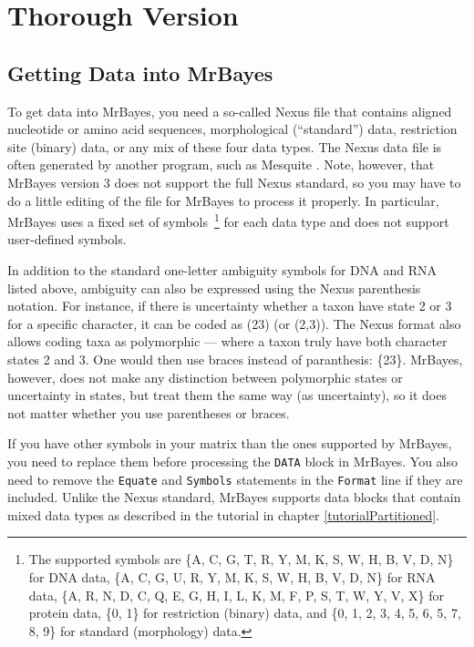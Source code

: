 \documentclass[12pt]{book}
\newcommand{\ttt}[1]{\texttt{#1}}
\begin{document}
\section{Thorough Version}

\subsection{Getting Data into MrBayes}

To get data into MrBayes, you need a so-called Nexus file that contains aligned nucleotide or amino
acid sequences, morphological (``standard'') data, restriction site (binary) data, or any mix of
these four data types. The Nexus data file is often generated by another program, such as Mesquite
\citep{maddison06}. Note, however, that MrBayes version 3 does not support the full Nexus standard,
so you may have to do a little editing of the file for MrBayes to process it properly. In
particular, MrBayes uses a fixed set of symbols~\footnote{The supported symbols are \{A, C, G, T, R, 
Y, M, K, S, W, H, B, V, D, N\} for DNA data, \{A, C, G, U, R, Y, M, K, S, W, H, B, V, D, N\} for RNA 
data, \{A, R, N, D, C, Q, E, G, H, I, L, K, M, F, P, S, T, W, Y, V, X\} for protein data, \{0, 1\} 
for restriction (binary) data, and \{0, 1, 2, 3, 4, 5, 6, 5, 7, 8, 9\} for standard (morphology) 
data.} for each data type and does not support user-defined symbols. 

In addition to the standard one-letter ambiguity symbols for DNA and RNA listed above, ambiguity
can also be expressed using the Nexus parenthesis notation. For instance, if there is uncertainty
whether a taxon have state 2 or 3 for a specific character, it can be coded as (23) (or (2,3)).
The Nexus format also allows coding taxa as polymorphic --- where a taxon truly have both character
states 2 and 3. One would then use braces instead of paranthesis: \{23\}. MrBayes, however, does
not make any distinction between polymorphic states or uncertainty in states, but treat them the
same way (as uncertainty), so it does not matter whether you use parentheses or braces.

If you have other symbols in your matrix than the ones supported by MrBayes, you need to replace
them before processing the \ttt{DATA} block in MrBayes. You also need to remove the \ttt{Equate}
and \ttt{Symbols} statements in the \ttt{Format} line if they are included. Unlike the Nexus
standard, MrBayes supports data blocks that contain mixed data types as described in the tutorial
in chapter \ref{tutorialPartitioned}.
\end{document}
